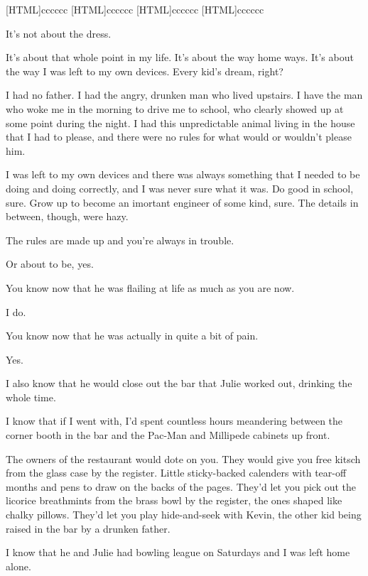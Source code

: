 \label{dad}
[HTML]{cccccc}
[HTML]{cccccc}
[HTML]{cccccc}
[HTML]{cccccc}

\begin{paracol}{2}
\begin{leftcolumn}
\noindent It's not about the dress.

It's about that whole point in my life. It's about the way home ways. It's about the way I was left to my own devices. Every kid's dream, right?

I had no father. I had the angry, drunken man who lived upstairs. I have the man who woke me in the morning to drive me to school, who clearly showed up at some point during the night. I had this unpredictable animal living in the house that I had to please, and there were no rules for what would or wouldn't please him.

I was left to my own devices and there was always something that I needed to be doing and doing correctly, and I was never sure what it was. Do good in school, sure. Grow up to become an imortant engineer of some kind, sure. The details in between, though, were hazy.

\begin{ally}
The rules are made up and you're always in trouble.
\end{ally}
Or about to be, yes.

\begin{ally}
You know now that he was flailing at life as much as you are now.
\end{ally}
I do.

\begin{ally}
You know now that he was actually in quite a bit of pain.
\end{ally}
Yes.

I also know that he would close out the bar that Julie worked out, drinking the whole time.

I know that if I went with, I'd spent countless hours meandering between the corner booth in the bar and the Pac-Man and Millipede cabinets up front.

\begin{ally}
The owners of the restaurant would dote on you. They would give you free kitsch from the glass case by the register. Little sticky-backed calenders with tear-off months and pens to draw on the backs of the pages. They'd let you pick out the licorice breathmints from the brass bowl by the register, the ones shaped like chalky pillows. They'd let you play hide-and-seek with Kevin, the other kid being raised in the bar by a drunken father.
\end{ally}
I know that he and Julie had bowling league on Saturdays and I was left home alone.


\end{leftcolumn}
\end{paracol}
